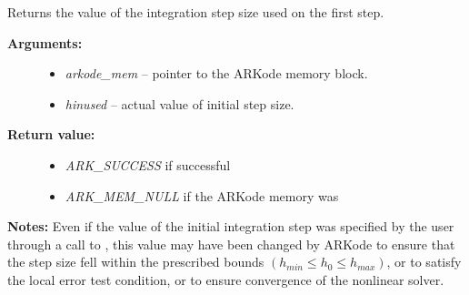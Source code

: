 \documentclass[letterpaper,10pt,english]{sphinxmanual}
\begin{document}
\begin{fulllineitems}
\label{c_interface/User_callable:c.ARKodeGetActualInitStep}
Returns the value of the integration step size used on the first step.
\begin{description}
\item[{\textbf{Arguments:}}] \leavevmode\begin{itemize}
\item {} 
\emph{arkode\_mem} -- pointer to the ARKode memory block.

\item {} 
\emph{hinused} -- actual value of initial step size.

\end{itemize}

\item[{\textbf{Return value:}}] \leavevmode\begin{itemize}
\item {} 
\emph{ARK\_SUCCESS} if successful

\item {} 
\emph{ARK\_MEM\_NULL} if the ARKode memory was 

\end{itemize}

\end{description}

\textbf{Notes:} Even if the value of the initial integration step was
specified by the user through a call to
{\hyperref[c_interface/User_callable:c.ARKodeSetInitStep]{\emph{}}}, this value may have been changed by
ARKode to ensure that the step size fell within the prescribed
bounds \((h_{min} \le h_0 \le h_{max})\), or to satisfy the
local error test condition, or to ensure convergence of the
nonlinear solver.

\end{fulllineitems}

\end{document}
